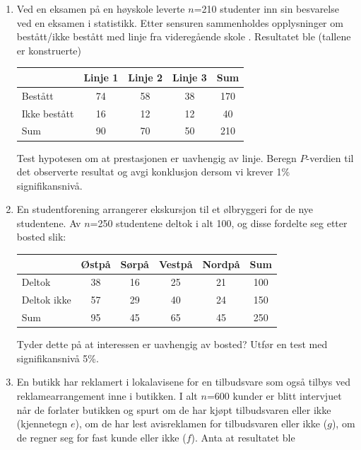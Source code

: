 \begin{enumerate}
\item
Ved en eksamen på en høyskole leverte $n$=210 studenter inn
sin besvarelse ved en eksamen i statistikk.  Etter sensuren sammenholdes
opplysninger om bestått/ikke bestått med linje fra videregående
 skole .  Resultatet ble (tallene er konstruerte)

\begin{center}
\begin{tabular}{l|ccc|c}
                 &  Linje 1  &  Linje 2  &  Linje 3   &   Sum  \\ \hline
Bestått      &    74     &    58     &    38      &   170  \\
Ikke bestått &    16     &    12     &    12      &    40  \\ \hline
Sum              &    90     &    70     &    50      &   210  \\ \hline
\end{tabular}
\end{center}

Test hypotesen om at prestasjonen er uavhengig av linje.  Beregn
$P$-verdien til det observerte resultat og avgi konklusjon dersom vi
krever 1\% signifikansnivå.

\item
En studentforening arrangerer ekskursjon til et ølbryggeri for de
nye studentene.  Av $n$=250 studentene deltok i alt 100, og disse
fordelte seg etter bosted slik:

\begin{center}
\begin{tabular}{l|cccc|c}
            &Østpå&Sørpå&Vestpå&Nordpå& Sum \\ \hline
Deltok      &    38      &   16       &  25      &  21      & 100 \\
Deltok ikke &    57      &   29       &  40      &  24      & 150 \\ \hline
Sum         &    95      &   45       &  65      &  45      & 250 \\ \hline
\end{tabular}
\end{center}
Tyder dette på at interessen er uavhengig av bosted?  Utfør en
test med signifikansnivå 5\%.

\item
En butikk har reklamert i lokalavisene for en tilbudsvare som også
tilbys ved reklamearrangement inne i butikken.  I alt $n$=600 kunder
er blitt intervjuet når de forlater butikken og spurt om de har
kjøpt tilbudsvaren eller ikke (kjennetegn $e$), om de har lest
avisreklamen for tilbudsvaren eller ikke ($g$), om de regner seg for
fast kunde eller ikke ($f$).  Anta at resultatet ble


\end{enumerate}
